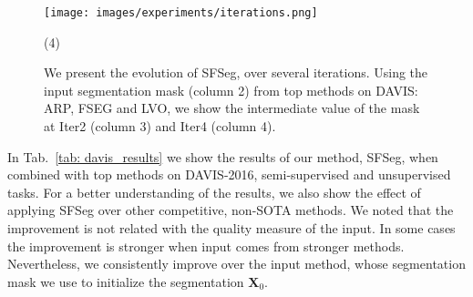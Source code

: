 \documentclass{article}
\begin{document}
\begin{figure}[!h]
	\begin{center}
		\texttt{[image: images/experiments/iterations.png]}
		\vspace*{-2mm}
		\begin{tasks}(4)
        \end{tasks}
	\end{center}
	\caption{We present the evolution of SFSeg, over several iterations. Using the input segmentation mask (column 2) from top methods on DAVIS: ARP, FSEG and LVO, we show the intermediate value of the mask at Iter2 (column 3) and Iter4 (column 4).}
	\label{fig: qualitative_iterations}
\end{figure}


In Tab.~\ref{tab: davis_results} we show the results of our method, SFSeg, when combined with top methods on DAVIS-2016, semi-supervised and unsupervised tasks. For a better understanding of the results, we also show the effect of applying SFSeg over other competitive, non-SOTA methods. We noted that the improvement is not related with the quality measure of the input. In some cases the improvement is stronger when input comes from stronger methods. Nevertheless, we consistently improve over the input method, whose segmentation mask we use to initialize the segmentation $\mathbf{X}_0$.
\end{document}
